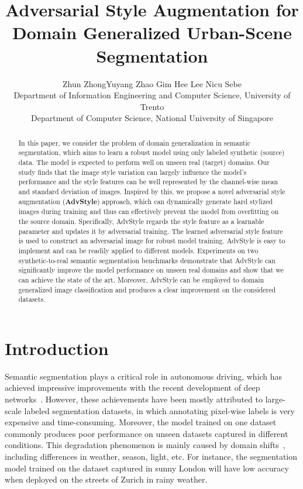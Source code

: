 \documentclass{article}
\title{Adversarial Style Augmentation for Domain Generalized Urban-Scene Segmentation}
\author{Zhun Zhong\dagger \quad Yuyang Zhao 
  \quad Gim Hee Lee
  \quad Nicu Sebe \\
   Department of Information Engineering and Computer Science, University of Trento \\
   Department of Computer Science, National University of Singapore
}
\begin{document}
\maketitle

\begin{abstract}
In this paper, we consider the problem of domain generalization in semantic segmentation, which aims to learn a robust model using only labeled synthetic (source) data. The model is expected to perform well on unseen real (target) domains. Our study finds that the image style variation can largely influence the model's performance and the style features can be well represented by the channel-wise mean and standard deviation of images. Inspired by this, we propose a novel adversarial style augmentation (\textbf{AdvStyle}) approach, which can dynamically generate hard stylized images during training and thus can effectively prevent the model from overfitting on the source domain. Specifically, AdvStyle regards the style feature as a learnable parameter and updates it by adversarial training. The learned adversarial style feature is used to construct an adversarial image for robust model training. AdvStyle is easy to implement and can be readily applied to different models. Experiments on two synthetic-to-real semantic segmentation benchmarks demonstrate that AdvStyle can significantly improve the model performance on unseen real domains and show that we can achieve the state of the art. Moreover, AdvStyle can be employed to domain generalized image classification and produces a clear improvement on the considered datasets.
\end{abstract}

\section{Introduction}
\label{sec:intro}


Semantic segmentation plays a critical role in autonomous driving, which has achieved impressive improvements with the recent development of deep  networks~\cite{long2015fully,chen2018deeplab,badrinarayanan2017segnet,zhao2022ncdss}. However, these achievements have been mostly  attributed to large-scale labeled segmentation datasets, in which annotating pixel-wise labels is very expensive and time-consuming. Moreover, the model trained on one dataset commonly produces poor performance on unseen datasets captured in different conditions. This degradation phenomenon is mainly caused by domain shifts~\cite{robustnet}, including differences in weather, season, light, etc. 
For instance, the segmentation model trained on the dataset captured in sunny London will have low accuracy when deployed on the streets of Zurich in rainy weather.
\end{document}
